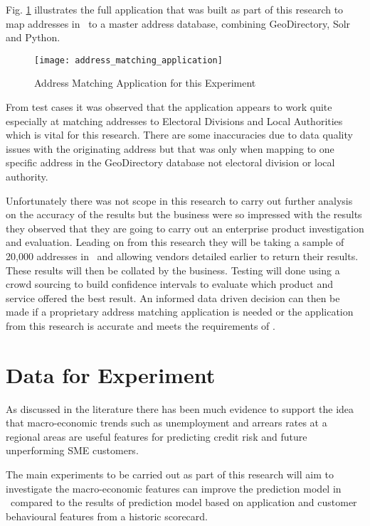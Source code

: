 Fig. \ref{fig:address_matching_application} illustrates the full application that was built as part of this research to map addresses in \subjectname\ to a master address database, combining GeoDirectory, Solr and Python.

\begin{figure}[H]
	\texttt{[image: address\_matching\_application]}
	\caption{Address Matching Application for this Experiment}
	\label{fig:address_matching_application}
\end{figure}

From test cases it was observed that the application appears to work quite especially at matching addresses to Electoral Divisions and Local Authorities which is vital for this research. There are some inaccuracies due to data quality issues with the originating address but that was only when mapping to one specific address in the GeoDirectory database not electoral division or local authority.

Unfortunately there was not scope in this research to carry out further analysis on the accuracy of the results but the business were so impressed with the results they observed that they are going to carry out an enterprise product investigation and evaluation. Leading on from this research they will be taking a sample of 20,000 addresses in \subjectname\ and allowing vendors detailed earlier to return their results. These results will then be collated by the business. Testing will done using a crowd sourcing to build confidence intervals to evaluate which product and service offered the best result. An informed data driven decision can then be made if a proprietary address matching application is needed or the application from this research is accurate and meets the requirements of \subjectname.  


\section{Data for Experiment}\label{sec:dataForExper}
As discussed in the literature there has been much evidence to support the idea that macro-economic trends such as unemployment and arrears rates at a regional areas are useful features for predicting credit risk and future unperforming SME customers.

The main experiments to be carried out as part of this research will aim to investigate the macro-economic features can improve the prediction model in \subjectname\ compared to the results of prediction model based on application and customer behavioural features from a historic scorecard. 

